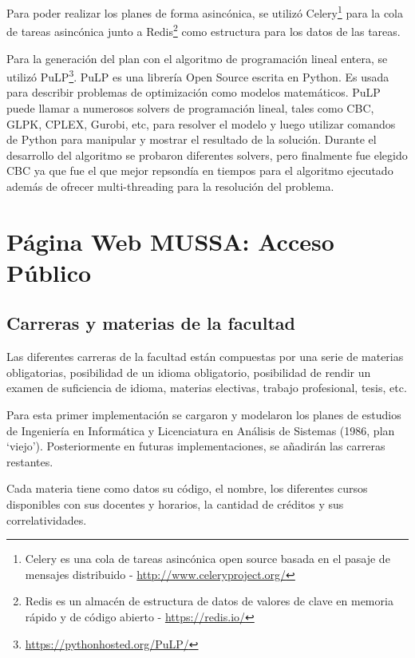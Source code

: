 \documentclass[a4paper]{article}
\begin{document}
Para poder realizar los planes de forma asincónica, se utilizó Celery\footnote{Celery es una cola de tareas asincónica open source basada en el pasaje de mensajes distribuido - \url{http://www.celeryproject.org/}} para la cola de tareas asincónica junto a Redis\footnote{Redis es un almacén de estructura de datos de valores de clave en memoria rápido y de código abierto - \url{https://redis.io/}} como estructura para los datos de las tareas.\newline

Para la generación del plan con el algoritmo de programación lineal entera, se utilizó PuLP\footnote{\url{https://pythonhosted.org/PuLP/}}. PuLP es una librería Open Source escrita en Python. Es usada para describir problemas de optimización como modelos matemáticos. PuLP puede llamar a numerosos solvers de programación lineal, tales como CBC, GLPK, CPLEX, Gurobi, etc, para resolver el modelo y luego utilizar comandos de Python para manipular y mostrar el resultado de la solución. Durante el desarrollo del algoritmo se probaron diferentes solvers, pero finalmente fue elegido CBC ya que fue el que mejor repsondía en tiempos para el algoritmo ejecutado además de ofrecer multi-threading para la resolución del problema.

\newpage
\section{Página Web MUSSA: Acceso Público}

\subsection{Carreras y materias de la facultad}

Las diferentes carreras de la facultad están compuestas por una serie de materias obligatorias, posibilidad de un idioma obligatorio, posibilidad de rendir un examen de suficiencia de idioma, materias electivas, trabajo profesional, tesis, etc.

Para esta primer implementación se cargaron y modelaron los planes de estudios de Ingeniería en Informática y Licenciatura en Análisis de Sistemas (1986, plan `viejo'). Posteriormente en futuras implementaciones, se añadirán las carreras restantes.\newline

Cada materia tiene como datos su código, el nombre, los diferentes cursos disponibles con sus docentes y horarios, la cantidad de créditos y sus correlatividades.
\end{document}
